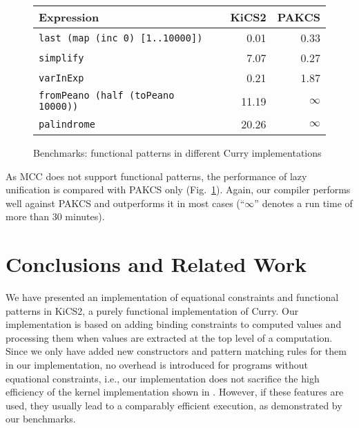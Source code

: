 \documentclass{llncs}
\newcommand{\code}[1]{\mbox{\small\texttt{#1}}}
\begin{document}
\begin{figure}[t]
\centering
\begin{tabular}{|l|r|r|}
\hline
Expression                              & KiCS2 & PAKCS    \\
\hline
\code{last (map (inc 0) [1..10000])}   &  0.01 & 0.33     \\
\code{simplify}                         & 7.07  & 0.27     \\
\code{varInExp}                         &  0.21  &  1.87    \\
\code{fromPeano (half (toPeano 10000))} & 11.19 & $\infty$ \\
\code{palindrome}                       & 20.26 & $\infty$ \\
\hline
\end{tabular}
\caption{Benchmarks: functional patterns in different Curry implementations}
 \label{fig:functional-patterns}
\end{figure}

As MCC does not support functional patterns, the performance of lazy
unification is compared with PAKCS only (Fig.~\ref{fig:functional-patterns}).
Again, our compiler performs well against PAKCS
and outperforms it in most cases (``$\infty$'' denotes a run time
of more than 30 minutes).


\section{Conclusions and Related Work}
\label{sec:Conclusions}

We have presented an implementation of equational constraints
and functional patterns in KiCS2, a purely functional implementation
of Curry. Our implementation is based on adding binding constraints
to computed values and processing them when values are extracted
at the top level of a computation.
Since we only have added new constructors and pattern matching rules 
for them in our implementation, no overhead is introduced for programs
without equational constraints, i.e.,
our implementation does not sacrifice the high efficiency
of the kernel implementation shown in
\cite{BrasselHanusPeemoellerReck11}.
However, if these features are used, they usually lead
to a comparably efficient execution, as demonstrated by our benchmarks.
\end{document}
